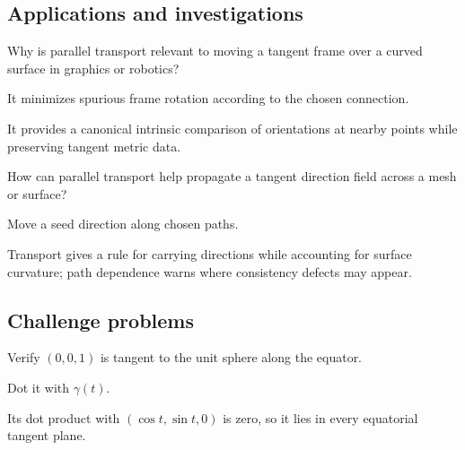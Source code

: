 \subsection*{Applications and investigations}

\begin{exercise}\label{exr:vii24-ped-13}
Why is parallel transport relevant to moving a tangent frame over a curved surface in graphics or robotics?
\end{exercise}

\begin{hint}
It minimizes spurious frame rotation according to the chosen connection.
\end{hint}

\begin{solution}
It provides a canonical intrinsic comparison of orientations at nearby points while preserving tangent metric data.
\end{solution}

\begin{exercise}\label{exr:vii24-ped-14}
How can parallel transport help propagate a tangent direction field across a mesh or surface?
\end{exercise}

\begin{hint}
Move a seed direction along chosen paths.
\end{hint}

\begin{solution}
Transport gives a rule for carrying directions while accounting for surface curvature; path dependence warns where consistency defects may appear.
\end{solution}

\subsection*{Challenge problems}

\begin{exercise}\label{exr:vii24-ped-15}
Verify \((0,0,1)\) is tangent to the unit sphere along the equator.
\end{exercise}

\begin{hint}
Dot it with \(\gamma(t)\).
\end{hint}

\begin{solution}
Its dot product with \((\cos t,\sin t,0)\) is zero, so it lies in every equatorial tangent plane.
\end{solution}


